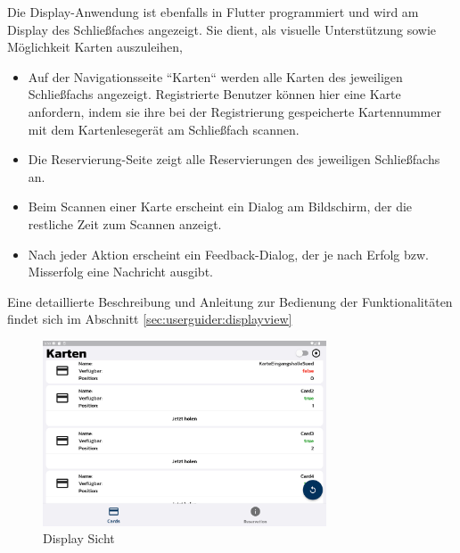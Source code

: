 \label{subsec:thero:display}
Die Display-Anwendung ist ebenfalls in Flutter programmiert und wird am Display des Schließfaches angezeigt. Sie dient, als visuelle Unterstützung sowie Möglichkeit Karten auszuleihen,
\begin{itemize}
    \item Auf der Navigationsseite ``Karten`` werden alle Karten des jeweiligen Schließfachs angezeigt. Registrierte Benutzer können hier eine Karte anfordern, indem sie ihre bei der Registrierung gespeicherte Kartennummer mit dem Kartenlesegerät am Schließfach scannen.
    \item Die Reservierung-Seite zeigt alle Reservierungen des jeweiligen Schließfachs an.
    
    \item Beim Scannen einer Karte erscheint ein Dialog am Bildschirm, der die restliche Zeit zum Scannen anzeigt.
    
    \item Nach jeder Aktion erscheint ein Feedback-Dialog, der je nach Erfolg bzw. Misserfolg eine Nachricht ausgibt.
\end{itemize}
    
Eine detaillierte Beschreibung und Anleitung zur Bedienung der Funktionalitäten findet sich im Abschnitt \ref{sec:userguider:displayview} 

\begin{figure}[h!]
\centering
\includegraphics[width=0.75\textwidth]{FLUTTER/images/GP/Display_Allg.png}
\caption{Display Sicht}
\end{figure}

\newpage
